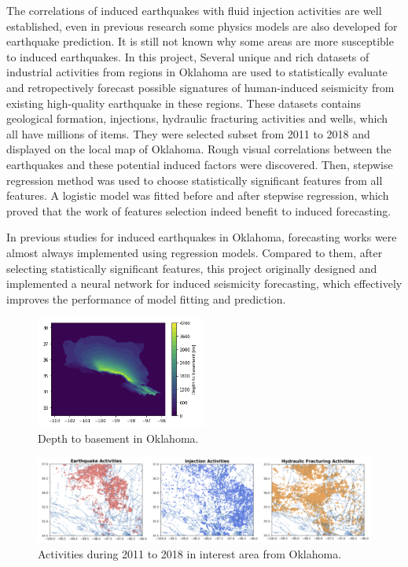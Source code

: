 \documentclass[final-report]{report-template}
\begin{document}
The correlations of induced earthquakes with fluid injection activities are well established, even in previous research some physics models are also developed for earthquake prediction.
It is still not known why some areas are more susceptible to induced earthquakes.
In this project, Several unique and rich datasets of industrial activities from regions in Oklahoma are used to statistically evaluate and retropectively forecast possible signatures of human-induced seismicity from existing high-quality earthquake in these regions. 
These datasets contains geological formation, injections, hydraulic fracturing activities and wells, which all have millions of items.
They were selected subset from 2011 to 2018 and displayed on the local map of Oklahoma. Rough visual correlations between the earthquakes and these potential induced factors were discovered.
Then, stepwise regression method was used to choose statistically significant features from all features. A logistic model was fitted before and after stepwise regression, which proved that the work of features selection indeed benefit to induced forecasting. 

In previous studies for induced earthquakes in Oklahoma, forecasting works were almost always implemented using regression models. Compared to them, after selecting statistically significant features, this project originally designed and implemented a neural network for induced seismicity forecasting, which effectively improves the performance of model fitting and prediction. 

\begin{figure}
    \begin{center}
        \includegraphics[width=0.5\textwidth]{depth_to_basement.png}
    \end{center}
    \caption{\label{fig:depth_to_basement} Depth to basement in Oklahoma.}
\end{figure}

\begin{figure}
    \begin{center}
        \includegraphics[width=1\textwidth]{activity.png}
    \end{center}
    \caption{\label{fig:activity} Activities during 2011 to 2018 in interest area from Oklahoma.}
\end{figure}
\end{document}
